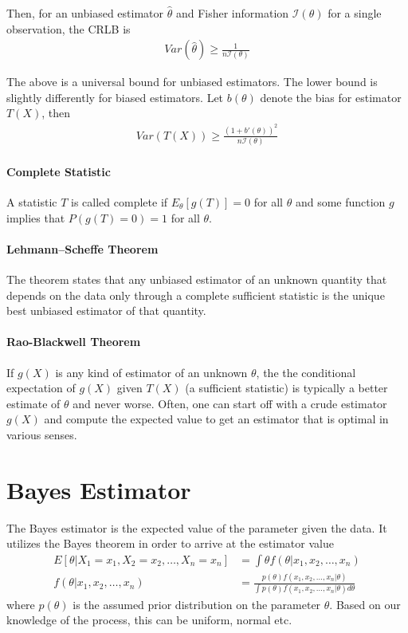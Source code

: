 \documentclass[../probability-notes.tex]{subfiles}
\begin{document}
    Then, for an unbiased estimator $\hat{\theta}$ and Fisher information $\mathcal{I}(\theta)$ for a single observation, the CRLB is
    \begin{align*}
        Var(\hat{\theta}) \geq \frac{1}{n\mathcal{I}(\theta)}
    \end{align*}

    The above is a universal bound for unbiased estimators. The lower bound is slightly differently for biased estimators. Let $b(\theta)$ denote the bias for estimator $T(X)$, then
    \begin{align*}
        Var(T(X)) \geq \frac{(1 + b'(\theta))^{2}}{n\mathcal{I}(\theta)}
    \end{align*}

    \paragraph{Complete Statistic} A statistic $T$ is called complete if $E_{\theta}[g(T)] = 0$ for all $\theta$ and some function $g$ implies that $P(g(T) = 0) = 1$ for all $\theta$.

    \paragraph{Lehmann–Scheffe Theorem} The theorem states that any unbiased estimator of an unknown quantity that depends on the data only through a complete sufficient statistic is the unique best unbiased estimator of that quantity.

    \paragraph{Rao-Blackwell Theorem} If $g(X)$ is any kind of estimator of an unknown $\theta$, the the conditional expectation of $g(X)$ given $T(X)$ (a sufficient statistic) is typically a better estimate of $\theta$ and never worse. Often, one can start off with a crude estimator $g(X)$ and compute the expected value to get an estimator that is optimal in various senses.

    \section{Bayes Estimator}
    The Bayes estimator is the expected value of the parameter given the data. It utilizes the Bayes theorem in order to arrive at the estimator value
    \begin{align*}
        E[\theta|X_{1} = x_{1}, X_{2} = x_{2}, \ldots, X_{n} = x_{n}] &= \int \theta f(\theta|x_{1}, x_{2}, \ldots, x_{n})\\
        f(\theta|x_{1}, x_{2}, \ldots, x_{n}) &= \frac{p(\theta) f(x_{1}, x_{2}, \ldots, x_{n} | \theta)}{\int p(\theta) f(x_{1}, x_{2}, \ldots, x_{n} | \theta) d\theta}
    \end{align*}
    where $p(\theta)$ is the assumed prior distribution on the parameter $\theta$. Based on our knowledge of the process, this can be uniform, normal etc.
\end{document}
